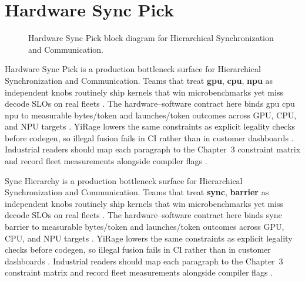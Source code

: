 \section{Hardware Sync Pick}
\label{sec:hardware_sync_pick}
\begin{figure}[t]
\centering
{}
\caption{Hardware Sync Pick block diagram for Hierarchical Synchronization and Communication.}
\label{fig:hardware_sync_pick_architecture}
\end{figure}


Hardware Sync Pick is a production bottleneck surface for Hierarchical Synchronization and Communication. Teams that treat \textbf{gpu}, \textbf{cpu}, \textbf{npu} as independent knobs routinely ship kernels that win microbenchmarks yet miss decode SLOs on real fleets \citep{taxbreak2026,semianalysis2024tma}. The hardware--software contract here binds gpu cpu npu to measurable bytes/token and launches/token outcomes across GPU, CPU, and NPU targets \citep{memoryfloor2026,amd2024xdna}. YiRage lowers the same constraints as explicit legality checks before codegen, so illegal fusion fails in CI rather than in customer dashboards \citep{nvidia2022hopper,amd2024aie}. Industrial readers should map each paragraph to the Chapter~3 constraint matrix and record fleet measurements alongside compiler flags \citep{semianalysis2024tma,dlbook}.

Sync Hierarchy is a production bottleneck surface for Hierarchical Synchronization and Communication. Teams that treat \textbf{sync}, \textbf{barrier} as independent knobs routinely ship kernels that win microbenchmarks yet miss decode SLOs on real fleets \citep{liu2024deepseekv3,memoryfloor2026}. The hardware--software contract here binds sync barrier to measurable bytes/token and launches/token outcomes across GPU, CPU, and NPU targets \citep{patel2025llminference,nvidia2022hopper}. YiRage lowers the same constraints as explicit legality checks before codegen, so illegal fusion fails in CI rather than in customer dashboards \citep{taxbreak2026,semianalysis2024tma}. Industrial readers should map each paragraph to the Chapter~3 constraint matrix and record fleet measurements alongside compiler flags \citep{memoryfloor2026,amd2024xdna}.

